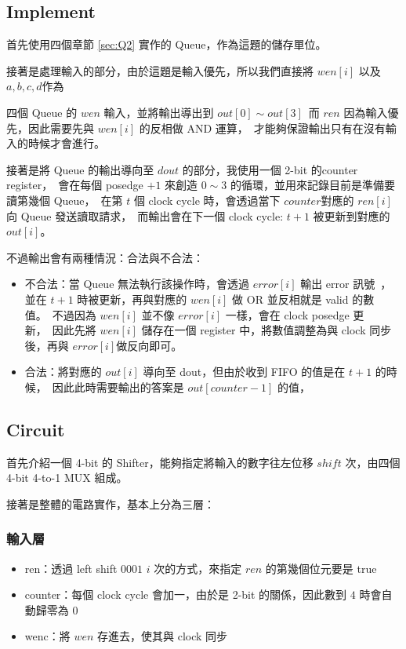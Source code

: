\documentclass[10.5pt,compsoc,UTF8]{CjC}
\theoremstyle{mystyle}
\begin{document}
\subsection{Implement}
首先使用四個章節 \ref{sec:Q2} 實作的 Queue，作為這題的儲存單位。
\par
接著是處理輸入的部分，由於這題是輸入優先，所以我們直接將 $wen[i]$ 以及 $a, b, c, d$作為\

四個 Queue 的 $wen$ 輸入，並將輸出導出到 $out[0] \sim out[3]$\
而 $ren$ 因為輸入優先，因此需要先與 $wen[i]$ 的反相做 AND 運算，\
才能夠保證輸出只有在沒有輸入的時候才會進行。
\par
接著是將 Queue 的輸出導向至 $dout$ 的部分，我使用一個 2-bit 的counter register，\
會在每個 posedge $+1$ 來創造 $0 \sim 3$ 的循環，並用來記錄目前是準備要讀第幾個 Queue，\
在第 $t$ 個 clock cycle 時，會透過當下 $counter$對應的 $ren[i]$ 向 Queue 發送讀取請求，\
而輸出會在下一個 clock cycle: $t + 1$ 被更新到對應的 $out[i]$。
\par
不過輸出會有兩種情況：合法與不合法：
\begin{itemize}
  \item 不合法：當 Queue 無法執行該操作時，會透過 $error[i]$ 輸出 error 訊號\
  ，並在 $t + 1$ 時被更新，再與對應的 $wen[i]$ 做 OR 並反相就是 valid 的數值。\
  不過因為 $wen[i]$ 並不像 $error[i]$ 一樣，會在 clock posedge 更新，\
  因此先將 $wen[i]$ 儲存在一個 register 中，將數值調整為與 clock 同步後，再與 $error[i] 做反向即可$。
  \item 合法：將對應的 $out[i]$ 導向至 dout，但由於收到 FIFO 的值是在 $t + 1$ 的時候，\
  因此此時需要輸出的答案是 $out[counter - 1]$ 的值，\
  
\end{itemize}

\subsection{Circuit}
首先介紹一個 4-bit 的 Shifter，能夠指定將輸入的數字往左位移 $shift$ 次，由四個 4-bit 4-to-1 MUX 組成。


接著是整體的電路實作，基本上分為三層：
\subsubsection*{輸入層}
\begin{itemize}
  \item ren：透過 left shift $0001$ $i$ 次的方式，來指定 $ren$ 的第幾個位元要是 true
  \item counter：每個 clock cycle 會加一，由於是 2-bit 的關係，因此數到 $4$ 時會自動歸零為 $0$
  \item wenc：將 $wen$ 存進去，使其與 clock 同步
\end{itemize}
\end{document}
